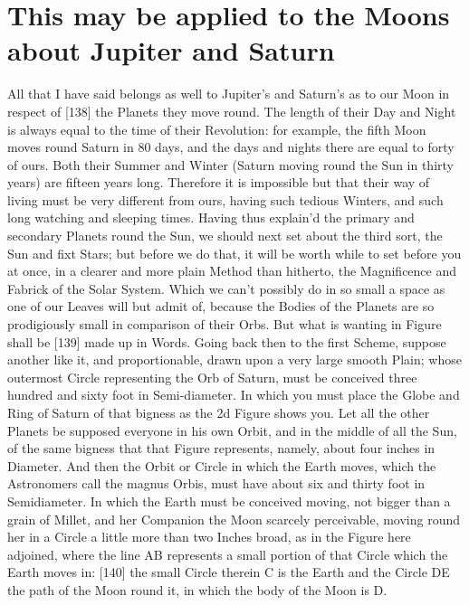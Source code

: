 \documentclass[letterpaper]{book}
\begin{document}
\section{This may be applied to the Moons about Jupiter and Saturn}

All that I have said belongs as well to Jupiter's and Saturn's as to our Moon
in respect of [138] the Planets they move round. The length of their Day and
Night is always equal to the time of their Revolution: for example, the fifth
Moon moves round Saturn in 80 days, and the days and nights there are equal to
forty of ours. Both their Summer and Winter (Saturn moving round the Sun in
thirty years) are fifteen years long. Therefore it is impossible but that their
way of living must be very different from ours, having such tedious Winters,
and such long watching and sleeping times.  Having thus explain'd the primary
and secondary Planets round the Sun, we should next set about the third sort,
the Sun and fixt Stars; but before we do that, it will be worth while to set
before you at once, in a clearer and more plain Method than hitherto, the
Magnificence and Fabrick of the Solar System. Which we can't possibly do in so
small a space as one of our Leaves will but admit of, because the Bodies of the
Planets are so prodigiously small in comparison of their Orbs. But what is
wanting in Figure shall be [139] made up in Words. Going back then to the first
Scheme, suppose another like it, and proportionable, drawn upon a very large
smooth Plain; whose outermost Circle representing the Orb of Saturn, must be
conceived three hundred and sixty foot in Semi-diameter. In which you must
place the Globe and Ring of Saturn of that bigness as the 2d Figure shows you.
Let all the other Planets be supposed everyone in his own Orbit, and in the
middle of all the Sun, of the same bigness that that Figure represents, namely,
about four inches in Diameter. And then the Orbit or Circle in which the Earth
moves, which the Astronomers call the magnus Orbis, must have about six and
thirty foot in Semidiameter. In which the Earth must be conceived moving, not
bigger than a grain of Millet, and her Companion the Moon scarcely perceivable,
moving round her in a Circle a little more than two Inches broad, as in the
Figure here adjoined, where the line AB represents a small portion of that
Circle which the Earth moves in: [140] the small Circle therein C is the Earth
and the Circle DE the path of the Moon round it, in which the body of the Moon
is D.  
\end{document}

